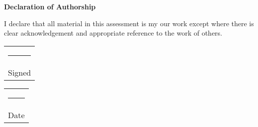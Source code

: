 \leavevmode%
\vfill\noindent
\begin{center}
  \textbf{Declaration of Authorship}
\end{center}
I declare that all material in this assessment is my our work except where there is clear acknowledgement and appropriate reference to the work of others.

\vspace*{4em}\noindent
\hfill%
\begin{tabular}[t]{c}
  \rule{10em}{0.4pt}\\ Signed
\end{tabular}%
\hfill%
\begin{tabular}[t]{c}
\rule{10em}{0.4pt}\\ Date
\end{tabular}%
\hfill
\strut
\vspace{4em}
